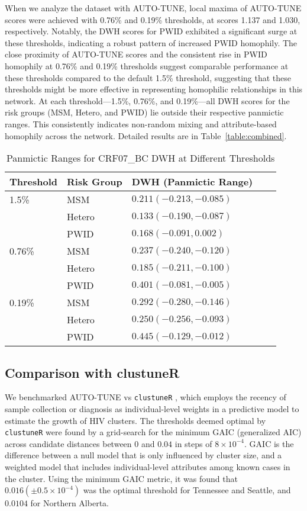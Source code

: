 \documentclass[utf8]{FrontiersinHarvard} %
\begin{document}
When we analyze the dataset with AUTO-TUNE, local maxima of AUTO-TUNE scores
were achieved with 0.76\% and 0.19\% thresholds, at scores 1.137 and 1.030,
respectively. Notably, the DWH scores for PWID exhibited a significant surge at
these thresholds, indicating a robust pattern of increased PWID homophily. The
close proximity of AUTO-TUNE scores and the consistent rise in PWID homophily
at 0.76\% and 0.19\% thresholds suggest comparable performance at these
thresholds compared to the default 1.5\% threshold, suggesting that these
thresholds might be more effective in representing homophilic relationships in
this network. At each threshold—1.5\%, 0.76\%, and 0.19\%—all DWH scores for
the risk groups (MSM, Hetero, and PWID) lie outside their respective panmictic
ranges. This consistently indicates non-random mixing and attribute-based
homophily across the network. Detailed results are in
Table~\ref{table:combined}.

\begin{table}[h!]
	\centering
	\begin{tabular}{lllll}
		\hline
		Threshold & Risk Group & DWH   (Panmictic Range)   \\
		\hline
		1.5\%     & MSM        & $0.211  (-0.213, -0.085)$ \\
		          & Hetero     & $0.133 (-0.190, -0.087)$  \\
		          & PWID       & $0.168 (-0.091, 0.002)$   \\
		\hline
		0.76\%    & MSM        & $0.237 (-0.240, -0.120)$  \\
		          & Hetero     & $0.185 (-0.211, -0.100)$  \\
		          & PWID       & $0.401 (-0.081, -0.005)$  \\
		\hline
		0.19\%    & MSM        & $0.292 (-0.280, -0.146)$  \\
		          & Hetero     & $0.250 (-0.256, -0.093)$  \\
		          & PWID       & $0.445 (-0.129, -0.012)$  \\
		\hline
	\end{tabular}
	\caption{Panmictic Ranges for CRF07\_BC DWH at Different Thresholds}
	\label{table:panmictic}
\end{table}

\subsection{Comparison with clustuneR}

We benchmarked AUTO-TUNE vs {\tt clustuneR} \cite{chato_public_2020}, which
employs the recency of sample collection or diagnosis as individual-level
weights in a predictive model to estimate the growth of HIV clusters. The
thresholds deemed optimal by {\tt clustuneR} were found by a grid-search for
the minimum GAIC (generalized AIC) across candidate distances between $0$ and
$0.04$ in steps of $8 \times 10^{-4}$. GAIC is the difference between a null
model that is only influenced by cluster size, and a weighted model that
includes individual-level attributes among known cases in the cluster. Using
the minimum GAIC metric, it was found that $0.016 (\pm 0.5\times 10^{-4})$ was
the optimal threshold for Tennessee and Seattle, and $0.0104$ for Northern
Alberta.
\end{document}
